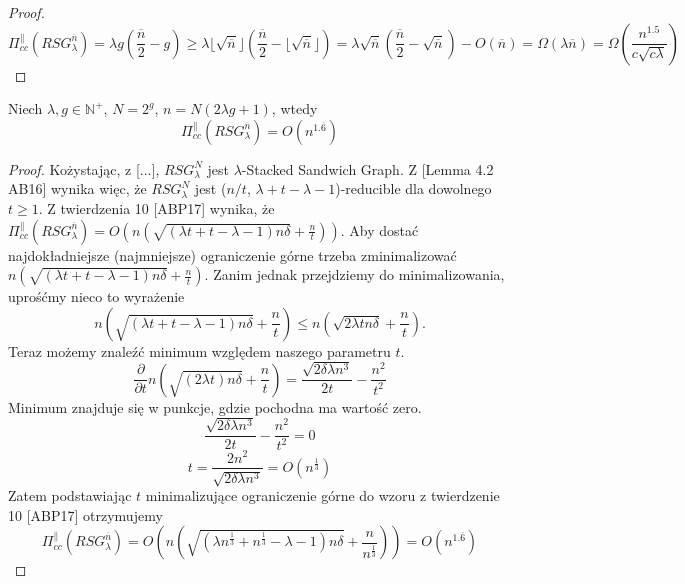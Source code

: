 \begin{proof}
	$$ \Pi_{cc}^{ \parallel }(RSG_{\lambda}^{\overline{n}}) = \lambda g \left( \frac{ \overline{n}}{2} - g \right) \geq \lambda \lfloor \sqrt{ \overline{n}} \rfloor \left( \frac{ \overline{n}}{2} - \lfloor \sqrt{ \overline{n}} \rfloor \right) = \lambda \sqrt{ \overline{n}} \left( \frac{ \overline{n}}{2} - \sqrt{ \overline{n}} \right) - O(\overline{n}) =  \Omega \left( \lambda \overline{n} \right) = \Omega \left( \frac{n^{1.5}}{c \sqrt{c \lambda}} \right) $$
	
\end{proof}




\begin{theorem}
	Niech $\lambda, g \in \mathbb{N}^{+}$, $N = 2^{g}$, $n = N(2 \lambda g + 1)$, wtedy
	$$ \Pi_{cc}^{ \parallel }(RSG_{\lambda}^{\overline{n}}) = O \left( n^{1.\overline{6}} \right) $$
\end{theorem}

\begin{proof}
	Kożystając, z [...], $RSG_{\lambda}^{N}$ jest $\lambda$-Stacked Sandwich Graph.
	Z [Lemma 4.2 AB16] wynika więc, że $RSG_{\lambda}^{N}$  jest ($n / t$, $\lambda + t - \lambda - 1$)-reducible dla dowolnego $t \geq 1$.
	Z twierdzenia 10 [ABP17] wynika, że $\Pi_{cc}^{ \parallel }(RSG_{\lambda}^{\overline{n}}) = O \left( n \left( \sqrt{( \lambda t + t - \lambda - 1)n \delta } + \frac{n}{t} \right) \right)$.
	Aby dostać najdokładniejsze (najmniejsze) ograniczenie górne trzeba zminimalizować
	$n \left( \sqrt{( \lambda t + t - \lambda - 1)n \delta } + \frac{n}{t} \right)$.
	Zanim jednak przejdziemy do minimalizowania, uprośćmy nieco to wyrażenie
	$$ n \left( \sqrt{( \lambda t + t - \lambda - 1)n \delta } + \frac{n}{t} \right) \leq n \left( \sqrt{ 2\lambda t n \delta } + \frac{n}{t} \right) .$$
	Teraz możemy znaleźć minimum względem naszego parametru $t$.
	$$ \frac{\partial}{\partial t} n \left( \sqrt{( 2\lambda t)n \delta } + \frac{n}{t} \right) = \frac{ \sqrt{ 2 \delta \lambda n^{3} }}{2t} - \frac{n^{2}}{t^{2}}$$
	Minimum znajduje się w punkcje, gdzie pochodna ma wartość zero.
	$$ \frac{ \sqrt{ 2 \delta \lambda n^{3} }}{2t} - \frac{n^{2}}{t^{2}} = 0$$
	$$ t = \frac{2n^{2}}{ \sqrt{ 2 \delta \lambda n^{3} }} = O \left( n^{\frac{1}{3}} \right) $$
	Zatem podstawiając $t$ minimalizujące ograniczenie górne do wzoru z twierdzenie 10 [ABP17] otrzymujemy
	$$ \Pi_{cc}^{ \parallel }(RSG_{\lambda}^{\overline{n}}) = O \left( n \left( \sqrt{( \lambda n^{\frac{1}{3}} + n^{\frac{1}{3}} - \lambda - 1)n \delta } + \frac{n}{n^{\frac{1}{3}}} \right) \right) = O \left( n^{1.\overline{6}} \right) $$
\end{proof}





